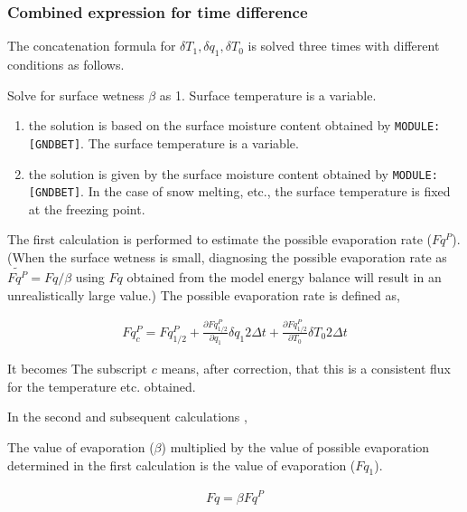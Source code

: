 \hypertarget{combined-expression-for-time-difference}{%
\subsubsection{Combined expression for time difference}\label{combined-expression-for-time-difference}}

The concatenation formula for \(\delta T_1, \delta q_1, \delta T_0\) is solved three times with different conditions as follows.

Solve for surface wetness \(\beta\) as 1. Surface temperature is a variable.

\begin{enumerate}
\def\labelenumi{\arabic{enumi}.}
\setcounter{enumi}{1}
\item
  the solution is based on the surface moisture content obtained by \texttt{MODULE:{[}GNDBET{]}}. The surface temperature is a variable.
\item
  the solution is given by the surface moisture content obtained by \texttt{MODULE:{[}GNDBET{]}}. In the case of snow melting, etc., the surface temperature is fixed at the freezing point.
\end{enumerate}

The first calculation is performed to estimate the possible evaporation rate (\(Fq^P\)). (When the surface wetness is small, diagnosing the possible evaporation rate as
\(\widetilde{Fq^P} = Fq / \beta\) using \(Fq\) obtained from the model energy balance will result in an unrealistically large value.) The possible evaporation rate is defined as,

\begin{eqnarray}
  Fq^P_c = Fq^P_{1/2}
       + \frac{\partial{Fq^P_{1/2}}}{\partial {q_1}} \delta q_1 2 \Delta t
       + \frac{\partial{Fq^P_{1/2}}}{\partial {T_0}} \delta T_0 2 \Delta t
\end{eqnarray}

It becomes The subscript \(c\) means, after correction, that this is a consistent flux for the temperature etc. obtained.

In the second and subsequent calculations ,

The value of evaporation (\(\beta\)) multiplied by the value of possible evaporation determined in the first calculation is the value of evaporation (\(Fq_1\)).

\begin{eqnarray}
        Fq = \beta Fq^P
\end{eqnarray}

